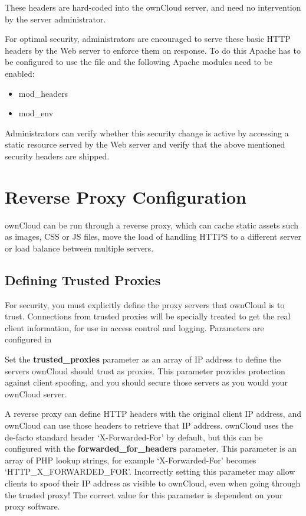 \documentclass[letterpaper,10pt,english]{sphinxmanual}
\begin{document}
These headers are hard-coded into the ownCloud server, and need no intervention
by the server administrator.

For optimal security, administrators are encouraged to serve these basic HTTP
headers by the Web server to enforce them on response. To do this Apache has to
be configured to use the  file and the following Apache
modules need to be enabled:
\begin{itemize}
\item {} 
mod\_headers

\item {} 
mod\_env

\end{itemize}

Administrators can verify whether this security change is active by accessing a
static resource served by the Web server and verify that the above mentioned
security headers are shipped.


\section{Reverse Proxy Configuration}
\label{configuration_server/reverse_proxy_configuration:rfc-4086-randomness-requirements-for-security}\label{configuration_server/reverse_proxy_configuration::doc}\label{configuration_server/reverse_proxy_configuration:reverse-proxy-configuration}
ownCloud can be run through a reverse proxy, which can cache static assets such
as images, CSS or JS files, move the load of handling HTTPS to a different
server or load balance between multiple servers.


\subsection{Defining Trusted Proxies}
\label{configuration_server/reverse_proxy_configuration:defining-trusted-proxies}
For security, you must explicitly define the proxy servers that ownCloud is to
trust. Connections from trusted proxies will be specially treated to get the
real client information, for use in access control and logging. Parameters are
configured in 

Set the \textbf{trusted\_proxies} parameter as an array of IP address to define the
servers ownCloud should trust as proxies. This parameter provides protection
against client spoofing, and you should secure those servers as you would your
ownCloud server.

A reverse proxy can define HTTP headers with the original client IP address,
and ownCloud can use those headers to retrieve that IP address. ownCloud uses
the de-facto standard header `X-Forwarded-For' by default, but this can be
configured with the \textbf{forwarded\_for\_headers} parameter. This parameter is an
array of PHP lookup strings, for example `X-Forwarded-For' becomes
`HTTP\_X\_FORWARDED\_FOR'. Incorrectly setting this parameter may allow clients
to spoof their IP address as visible to ownCloud, even when going through the
trusted proxy! The correct value for this parameter is dependent on your
proxy software.
\end{document}
